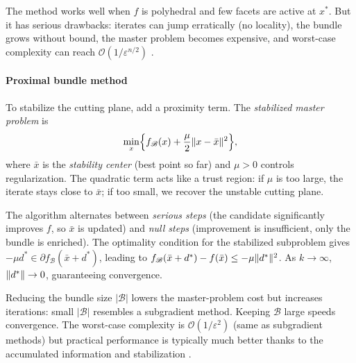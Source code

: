 The method works well when $f$ is polyhedral and few facets are active at $x^*$.
But it has serious drawbacks: iterates can jump erratically (no locality), the bundle grows without bound, the master problem becomes expensive, and worst-case complexity can reach $\mathcal{O}(1/\varepsilon^{n/2})$ \cite{frangioni2020}.

\paragraph{Proximal bundle method}

To stabilize the cutting plane, add a proximity term.
The \emph{stabilized master problem} is
\begin{equation}\label{eq:proximal-bundle}
	\min_x \Bigl\{f_{\mathcal{B}}(x) + \frac{\mu}{2}\lVert x - \bar{x}\rVert^2\Bigr\},
\end{equation}
where $\bar{x}$ is the \emph{stability center} (best point so far) and $\mu > 0$ controls regularization.
The quadratic term acts like a trust region: if $\mu$ is too large, the iterate stays close to $\bar{x}$; if too small, we recover the unstable cutting plane.

The algorithm alternates between \emph{serious steps} (the candidate significantly improves $f$, so $\bar{x}$ is updated) and \emph{null steps} (improvement is insufficient, only the bundle is enriched).
The optimality condition for the stabilized subproblem gives $-\mu d^* \in \partial f_{\mathcal{B}}(\bar{x} + d^*)$, leading to $f_{\mathcal{B}}(\bar{x} + d^*) - f(\bar{x}) \leq -\mu\lVert d^*\rVert^2$.
As $k \to \infty$, $\lVert d^*\rVert \to 0$, guaranteeing convergence.

Reducing the bundle size $|\mathcal{B}|$ lowers the master-problem cost but increases iterations: small $|\mathcal{B}|$ resembles a subgradient method.
Keeping $\mathcal{B}$ large speeds convergence.
The worst-case complexity is $\mathcal{O}(1/\varepsilon^2)$ (same as subgradient methods) but practical performance is typically much better thanks to the accumulated information and stabilization \cite{frangioni2020}.